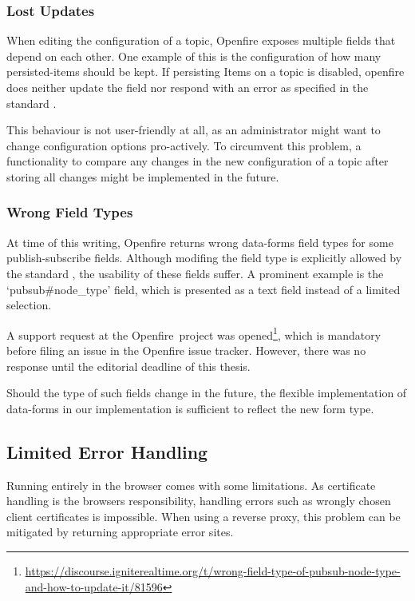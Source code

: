 \subsubsection{Lost Updates}\label{sec:lost-updates}

When editing the configuration of a \gls{topic}, Openfire exposes multiple fields that depend on each other.
One example of this is the configuration of how many \glspl{persisted-item} should be kept.
If persisting Items on a \gls{topic} is disabled, openfire does neither update the field nor respond with an error as specified in the standard \cite{xep-0060, xep-0004}.

This behaviour is not user-friendly at all, as an administrator might want to change configuration options pro-actively. To circumvent this problem, a functionality to compare any changes in the new configuration of a topic after storing all changes might be implemented in the future.

\subsubsection{Wrong Field Types}

At time of this writing, Openfire returns wrong \gls{data-forms} field types for some \gls{publish-subscribe} fields.
Although modifing the field type is explicitly allowed by the standard \cite{xep-0060}, the usability of these fields suffer.
A prominent example is the `pubsub\#node\_type' field, which is presented as a text field instead of a limited selection.

A support request at the Openfire~project was opened\footnote{\url{https://discourse.igniterealtime.org/t/wrong-field-type-of-pubsub-node-type-and-how-to-update-it/81596}},
which is mandatory before filing an issue in the Openfire issue tracker.
However, there was no response until the editorial deadline of this thesis.

Should the type of such fields change in the future, the flexible implementation of \gls{data-forms} in our implementation is sufficient to reflect the new form type.

\subsection{Limited Error Handling}

Running entirely in the browser comes with some limitations. As certificate handling is the browsers responsibility, handling errors such as wrongly chosen client certificates is impossible. When using a reverse proxy, this problem can be mitigated by returning appropriate error sites.

